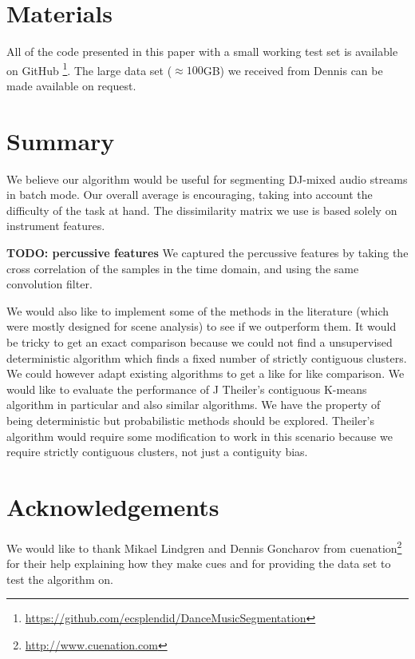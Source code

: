 \documentclass[twocolumn]{article}
\begin{document}
\section{Materials}

All of the code presented in this paper with a small working test set is available on GitHub \footnote{\url{https://github.com/ecsplendid/DanceMusicSegmentation}}. The large data set ($\approx100$GB) we received from Dennis can be made available on request.

\section{Summary}\label{conclusions}

We believe our algorithm would be useful for segmenting DJ-mixed audio streams in batch mode. Our overall average is encouraging, taking into account the difficulty of the task at hand. The dissimilarity matrix we use is based solely on instrument features. 

\textbf{TODO: percussive features}
We captured the percussive features by taking the cross correlation of the samples in the time domain, and using the same convolution filter. 


 We would also like to implement some of the methods in the literature (which were mostly designed for scene analysis) to see if we outperform them. It would be tricky to get an exact comparison because we could not find a unsupervised deterministic algorithm which finds a fixed number of strictly contiguous clusters. We could however adapt existing algorithms to get a like for like comparison. We would like to evaluate the performance of J Theiler's contiguous K-means algorithm in particular \cite{theiler1997contiguity} and also similar algorithms. We have the property of being deterministic but probabilistic methods should be explored. Theiler's algorithm would require some modification to work in this scenario because we require strictly contiguous clusters, not just a contiguity bias. 


\section{Acknowledgements}

We would like to thank Mikael Lindgren and Dennis Goncharov from cuenation\footnote{\url{http://www.cuenation.com}} for their help explaining how they make cues and for providing the data set to test the algorithm on.




\end{document}
